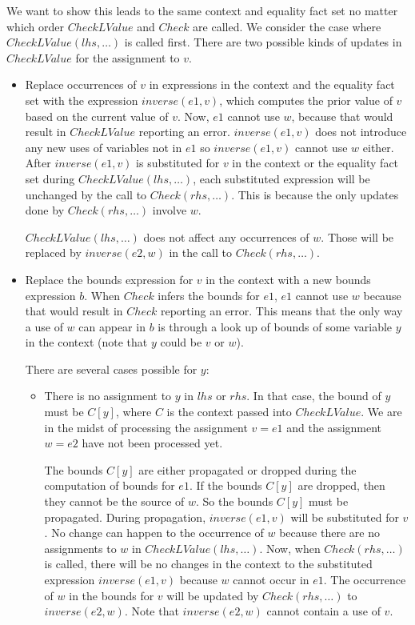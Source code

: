 We want to show this leads to the same context and equality fact set no matter which order 
$CheckLValue$ and $Check$ are called.  We consider the case where  $CheckLValue(lhs, \ldots)$ 
is called first. There are two possible kinds of updates in $CheckLValue$ for the assignment to $v$.
\begin{itemize}
\item Replace occurrences of $v$ in expressions in the context and the equality fact set with the
expression $inverse(e1, v)$, which computes the prior value of $v$ based on the current value of $v$. 
Now, $e1$ cannot use $w$, because that would result in $CheckLValue$ reporting an error.  
$inverse(e1, v)$ does 
not introduce any new uses of variables not in $e1$ so $inverse(e1, v)$ cannot use $w$ either.   After $inverse(e1, v)$ is substituted for $v$ in the context
or the equality fact set during $CheckLValue(lhs, \ldots)$, each substituted expression will be
unchanged by the call to $Check(rhs, \ldots)$.  This is because the only updates done by 
$Check(rhs, \ldots)$ involve $w$.   

$CheckLValue(lhs, \ldots)$ does not affect any occurrences of $w$.  Those will be replaced 
by $inverse(e2, w)$ in the call to $Check(rhs, \ldots)$.

\item Replace the bounds expression for $v$ in the context with a new bounds expression $b$.
When $Check$ infers the bounds for $e1$, $e1$ cannot use $w$ because that would result in 
$Check$ reporting an error. This means that the only way a use of $w$ can appear in $b$ is
through a look up of bounds of some variable $y$ in the context (note that $y$ could be
$v$ or $w$).

There are several cases possible for $y$:
\begin{itemize}
\item There is no assignment to $y$ in $lhs$ or $rhs$.   In that case, the bound of $y$
must be $C[y]$, where $C$ is the context passed into $CheckLValue$.  We are in the midst
of processing the assignment $v = e1$ and the assignment $w = e2$ have not been processed yet.  

The bounds $C[y]$ are  either propagated or dropped during the computation of bounds for $e1$.
If the bounds $C[y]$ are dropped, then they cannot be the source of $w$.  So the bounds $C[y]$ must be propagated.  During propagation, $inverse(e1, v)$ will be substituted for $v$.  No change can happen to the occurrence of $w$ because there are no assignments to $w$
in $CheckLValue(lhs, \ldots)$.  Now, when $Check(rhs, \ldots)$ is called, there will be no changes in the
context to the substituted expression $inverse(e1, v)$ because $w$ cannot occur in $e1$.  
The occurrence of $w$ in the bounds for $v$ will be updated by $Check(rhs, \ldots)$ to $inverse(e2, w)$.
Note that $inverse(e2, w)$ cannot contain a use of $v$.


\end{itemize}
\end{itemize}
